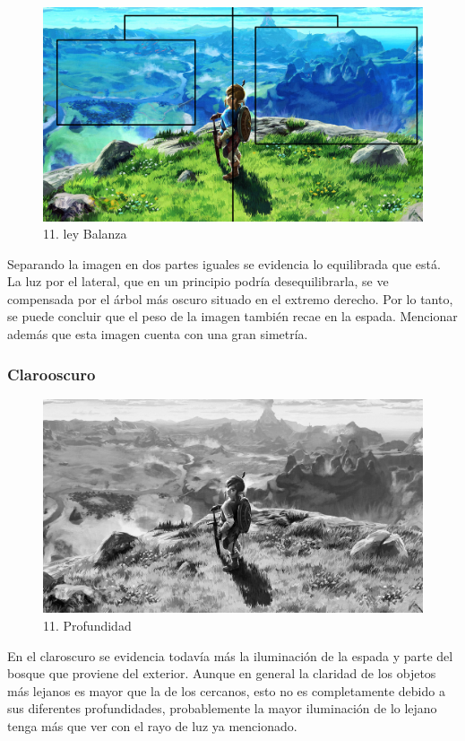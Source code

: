 \documentclass[12pt]{article}
\begin{document}
      \begin{figure}[H]
      \centering
      \includegraphics[scale=0.35]{images/Carlos/15/Balanza.jpg}
      \caption{\small 11. ley Balanza}
      \end{figure}
      Separando la imagen en dos partes iguales se evidencia lo equilibrada que está. La luz por el lateral, que en un principio podría desequilibrarla, se ve compensada por el árbol más oscuro situado en el extremo derecho. Por lo tanto, se puede concluir que el peso de la imagen también recae en la espada. Mencionar además que esta imagen cuenta con una gran simetría.

      \subsubsection{Clarooscuro}
      \begin{figure}[H]
      \centering
      \includegraphics[scale=0.35]{images/Carlos/15/Grises.jpg}
      \caption{\small 11. Profundidad}
      \end{figure}
      En el claroscuro se evidencia todavía más la iluminación de la espada y parte del bosque que proviene del exterior. Aunque en general la claridad de los objetos más lejanos es mayor que la de los cercanos, esto no es completamente debido a sus diferentes profundidades, probablemente la mayor iluminación de lo lejano tenga más que ver con el rayo de luz ya mencionado.
\end{document}
